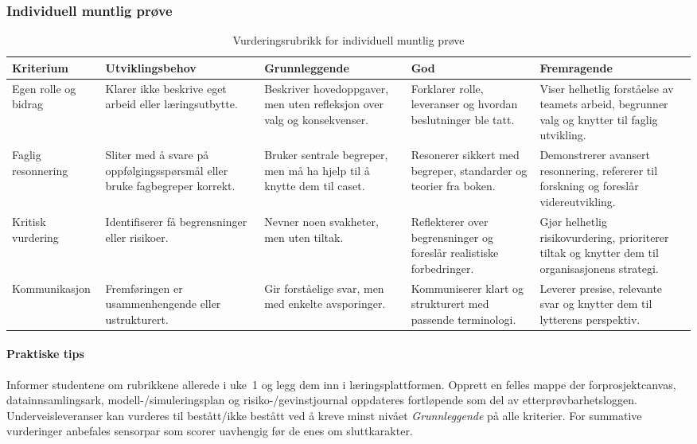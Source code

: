 \subsubsection{Individuell muntlig prøve}
\begin{table}[h]
    \centering
    \caption{Vurderingsrubrikk for individuell muntlig prøve}
    \label{tab:rubrikk-muntlig}
    \begin{tabular}{p{2.8cm}p{3.0cm}p{3.0cm}p{3.0cm}p{3.0cm}}
        \toprule
        \textbf{Kriterium} & \textbf{Utviklingsbehov} & \textbf{Grunnleggende} & \textbf{God} & \textbf{Fremragende} \\
        \midrule
        Egen rolle og bidrag & Klarer ikke beskrive eget arbeid eller læringsutbytte. & Beskriver hovedoppgaver, men uten refleksjon over valg og konsekvenser. & Forklarer rolle, leveranser og hvordan beslutninger ble tatt. & Viser helhetlig forståelse av teamets arbeid, begrunner valg og knytter til faglig utvikling. \\
        Faglig resonnering & Sliter med å svare på oppfølgingsspørsmål eller bruke fagbegreper korrekt. & Bruker sentrale begreper, men må ha hjelp til å knytte dem til caset. & Resonerer sikkert med begreper, standarder og teorier fra boken. & Demonstrerer avansert resonnering, refererer til forskning og foreslår videreutvikling. \\
        Kritisk vurdering & Identifiserer få begrensninger eller risikoer. & Nevner noen svakheter, men uten tiltak. & Reflekterer over begrensninger og foreslår realistiske forbedringer. & Gjør helhetlig risikovurdering, prioriterer tiltak og knytter dem til organisasjonens strategi. \\
        Kommunikasjon & Fremføringen er usammenhengende eller ustrukturert. & Gir forståelige svar, men med enkelte avsporinger. & Kommuniserer klart og strukturert med passende terminologi. & Leverer presise, relevante svar og knytter dem til lytterens perspektiv. \\
        \bottomrule
    \end{tabular}
\end{table}

\paragraph{Praktiske tips}
Informer studentene om rubrikkene allerede i uke~1 og legg dem inn i læringsplattformen. Opprett en felles mappe der forprosjektcanvas, datainnsamlingsark, modell-/simuleringsplan og risiko-/gevinstjournal oppdateres fortløpende som del av etterprøvbarhetsloggen. Underveisleveranser kan vurderes til bestått/ikke bestått ved å kreve minst nivået \emph{Grunnleggende} på alle kriterier. For summative vurderinger anbefales sensorpar som scorer uavhengig før de enes om sluttkarakter.

